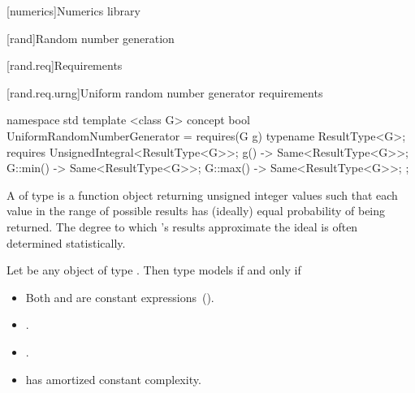 [numerics]{Numerics library}

\setcounter{section}{4}
[rand]{Random number generation}

[rand.req]{Requirements}


\setcounter{subsubsection}{2}
[rand.req.urng]{Uniform random number generator requirements}%
%

\begin{addedblock}
\begin{codeblock}
namespace std {
  template <class G>
  concept bool UniformRandomNumberGenerator =
    requires(G g) {
      typename ResultType<G>;
      requires UnsignedIntegral<ResultType<G>>;
      { g() } -> Same<ResultType<G>>;
      { G::min() } -> Same<ResultType<G>>;
      { G::max() } -> Same<ResultType<G>>;
    };
}
\end{codeblock}
\end{addedblock}

\pnum
A 
 of type 
is a function object
returning unsigned integer values
such that each value
in the range of possible results
has (ideally) equal probability
of being returned.
\enternote
 The degree to which 's results
 approximate the ideal
 is often determined statistically.
\exitnote


\begin{addedblock}
\pnum
Let  be any object of type . Then type  models
 if and only if

\begin{itemize}
\item Both  and  are constant expressions~().
\item {}.
\item {}.
\item {} has amortized constant complexity.
\end{itemize}

\end{addedblock}